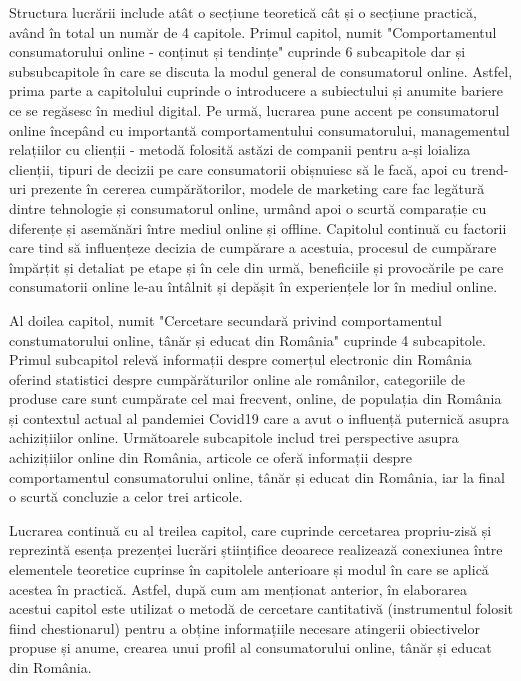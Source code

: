 \documentclass[a4paper, 12pt]{article}
\begin{document}
	\quad Structura lucrării include atât o secțiune teoretică cât și o secțiune practică, având în total un număr de 4 capitole. Primul capitol, numit "Comportamentul consumatorului online - conținut și tendințe" cuprinde 6 subcapitole dar și subsubcapitole în care se discuta la modul general de consumatorul online. Astfel, prima parte a capitolului cuprinde o introducere a subiectului și anumite bariere ce se regăsesc în mediul digital. Pe urmă, lucrarea pune accent pe consumatorul online începând cu importantă comportamentului consumatorului,  managementul relațiilor cu clienții - metodă folosită astăzi de companii pentru a-și loializa clienții, tipuri de decizii pe care consumatorii obișnuiesc să le facă, apoi cu trend-uri prezente în cererea cumpărătorilor, modele de marketing care fac legătură dintre tehnologie și consumatorul online, urmând apoi o scurtă comparație cu diferențe și asemănări între mediul online și offline. Capitolul continuă cu factorii care tind să influențeze decizia de cumpărare a acestuia, procesul de cumpărare împărțit și detaliat pe etape și în cele din urmă,  beneficiile și provocările pe care consumatorii online le-au întâlnit și depășit în experiențele lor în mediul online. 
	
	\quad Al doilea capitol, numit "Cercetare secundară privind comportamentul constumatorului online, tânăr și educat din România" cuprinde 4 subcapitole. Primul subcapitol relevă informații despre comerțul electronic din România oferind statistici despre cumpărăturilor online ale românilor, categoriile de produse care sunt cumpărate cel mai frecvent, online, de populația din România și contextul actual al pandemiei Covid19 care a avut o influență puternică asupra achizițiilor online. Următoarele subcapitole includ trei perspective asupra achizițiilor online din România, articole ce oferă informații despre comportamentul consumatorului online, tânăr și educat din România, iar la final o scurtă concluzie a celor trei articole.
	
	\quad Lucrarea continuă cu al treilea capitol, care cuprinde cercetarea propriu-zisă și reprezintă esența prezenței lucrări științifice deoarece realizează conexiunea între elementele teoretice cuprinse în capitolele anterioare și modul în care se aplică acestea în practică. Astfel, după cum am menționat anterior, în elaborarea acestui capitol este utilizat o metodă de cercetare cantitativă (instrumentul folosit fiind chestionarul) pentru a obține informațiile necesare atingerii obiectivelor propuse și anume, crearea unui profil al consumatorului online, tânăr și educat din România.
	
\end{document}
